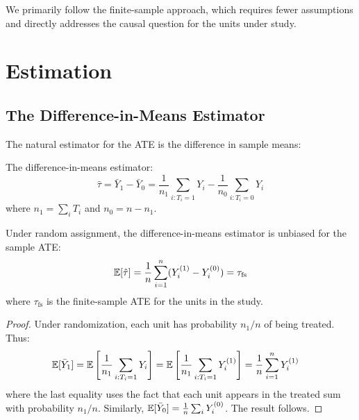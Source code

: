 We primarily follow the finite-sample approach, which requires fewer assumptions and directly addresses the causal question for the units under study.


\section{Estimation}
\label{sec:rct_estimation}

\subsection{The Difference-in-Means Estimator}

The natural estimator for the ATE is the difference in sample means:

\begin{definition}
\label{def:dim}
The difference-in-means estimator:
\begin{equation}
\hat{\tau} = \bar{Y}_1 - \bar{Y}_0 = \frac{1}{n_1} \sum_{i: T_i = 1} Y_i - \frac{1}{n_0} \sum_{i: T_i = 0} Y_i
\label{eq:dim}
\end{equation}
where $n_1 = \sum_i T_i$ and $n_0 = n - n_1$.
\end{definition}

\begin{theorem}[Unbiasedness]
\label{thm:dim_unbiased}
Under random assignment, the difference-in-means estimator is unbiased for the sample ATE:
\begin{equation}
\mathbb{E}[\hat{\tau}] = \frac{1}{n} \sum_{i=1}^{n} (Y^{(1)}_i - Y^{(0)}_i) = \tau_{\text{fs}}
\end{equation}
where $\tau_{\text{fs}}$ is the finite-sample ATE for the units in the study.
\end{theorem}

\begin{proof}
Under randomization, each unit has probability $n_1/n$ of being treated. Thus:
\begin{align*}
\mathbb{E}[\bar{Y}_1] &= \mathbb{E}\left[\frac{1}{n_1} \sum_{i: T_i = 1} Y_i\right] = \mathbb{E}\left[\frac{1}{n_1} \sum_{i: T_i = 1} Y^{(1)}_i\right] = \frac{1}{n} \sum_{i=1}^{n} Y^{(1)}_i
\end{align*}
where the last equality uses the fact that each unit appears in the treated sum with probability $n_1/n$. Similarly, $\mathbb{E}[\bar{Y}_0] = \frac{1}{n}\sum_i Y^{(0)}_i$. The result follows.
\end{proof}


